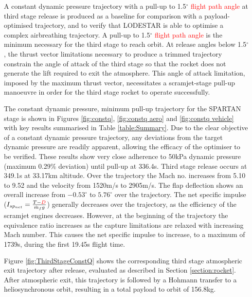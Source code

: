 \documentclass[journal]{new-aiaa}
\newcommand{\PayloadToOrbitConstq}{156.8}
\newcommand{\SeparationAltConstq}{33.17}
\newcommand{\SeparationvConstq}{2905}
\newcommand{\FlightTimeConstq}{349.1}
\begin{document}
A constant dynamic pressure trajectory with a pull-up to 1.5$^\circ$ \textcolor{red}{flight path angle} at third stage release is produced as a baseline for comparison with a payload-optimised trajectory, and to verify that LODESTAR is able to optimise a complex airbreathing trajectory. A pull-up to 1.5$^\circ$ \textcolor{red}{flight path angle} is the minimum necessary for the third stage to reach orbit. At release angles below 1.5$^\circ$, the thrust vector limitations necessary to produce a trimmed trajectory constrain the angle of attack of the third stage so that the rocket does not generate the lift required to exit the atmosphere. This angle of attack limitation, imposed by the maximum thrust vector, necessitates a scramjet-stage pull-up manoeuvre in order for the third stage rocket to operate successfully. 


 The constant dynamic pressure, minimum pull-up trajectory for the SPARTAN stage is shown in Figures \ref{fig:constq}, \ref{fig:constq aero} and \ref{fig:constq vehicle} with key results summarised in Table \ref{table:Summary}. Due to the clear objective of a constant dynamic pressure trajectory, any deviations from the target dynamic pressure are readily apparent, allowing the efficacy of the optimiser to be verified. 
 These results show very close adherence to 50kPa dynamic pressure (maximum 0.29\% deviation) until pull-up at 336.4s. Third stage release occurs at \FlightTimeConstq s at \SeparationAltConstq km altitude. 
 Over the trajectory the Mach no. increases from 5.10 to 9.52 and the velocity from 1520m/s to \SeparationvConstq m/s. The flap deflection shows an overall increase from $-0.53^\circ$ to $5.76^\circ$ over the trajectory.  The net specific impulse ($I_{sp_{net}} = \frac{T-\textcolor{red}{D}}{\dot{m}_f g}$) generally decreases over the trajectory, as the efficiency of the scramjet engines decreases. However, at the beginning of the trajectory the equivalence ratio increases as the capture limitations are relaxed with increasing Mach number. This causes the net specific impulse to increase, to a maximum of 1739s, during the first 19.45s flight time. 

Figure \ref{fig:ThirdStageConstQ} shows the corresponding third stage atmospheric exit trajectory after release, evaluated as described in Section \ref{section:rocket}. After atmospheric exit, this trajectory is followed by a Hohmann transfer to a heliosynchronous orbit, resulting in a total payload to orbit of \PayloadToOrbitConstq kg.
\end{document}
